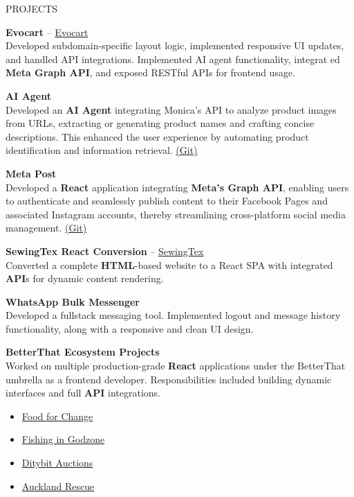 \documentclass{resume} %
\begin{document}
\begin{rSection}{PROJECTS}
\vspace{-1.25em}
\item \textbf{Evocart} – \href{https://apple.nazarahnaturals.com/}{Evocart} \\
Developed subdomain-specific layout logic, implemented responsive UI updates, and handled API integrations.
Implemented AI agent functionality, integrat ed \textbf{Meta Graph API}, and exposed RESTful APIs for frontend usage.

\item \textbf{AI Agent} \\
Developed an \textbf{AI Agent} integrating Monica's API to analyze product images from URLs, extracting or generating product names and crafting concise descriptions. This enhanced the user experience by automating product identification and information retrieval.
\href{https://github.com/rafidrahman1/ai_agent}{(Git)}

\item \textbf{Meta Post} \\
Developed a \textbf{React} application integrating \textbf{Meta's Graph API}, enabling users to authenticate and seamlessly publish content to their Facebook Pages and associated Instagram accounts, thereby streamlining cross-platform social media management.
\href{https://github.com/rafidrahman1/meta_post}{(Git)}

\item \textbf{SewingTex React Conversion} – \href{https://sewingtexapparels.com/}{SewingTex} \\
Converted a complete \textbf{HTML}-based website to a React SPA with integrated \textbf{API}s for dynamic content rendering.

\item \textbf{WhatsApp Bulk Messenger} \\
Developed a fullstack messaging tool. Implemented logout and message history functionality, along with a responsive and clean UI design.

\item \textbf{BetterThat Ecosystem Projects} \\
Worked on multiple production-grade \textbf{React} applications under the BetterThat umbrella as a frontend developer. Responsibilities included building dynamic interfaces and full \textbf{API} integrations.
\begin{itemize}
    \item \href{https://ffc.betterthatconnect.com/}{Food for Change}
    \item \href{https://fig.betterthatconnect.com/}{Fishing in Godzone}
    \item \href{https://ditybit.com/}{Ditybit Auctions}
    \item \href{https://ar.betterthatconnect.com/}{Auckland Rescue}
\end{itemize}



\end{rSection}
\end{document}
